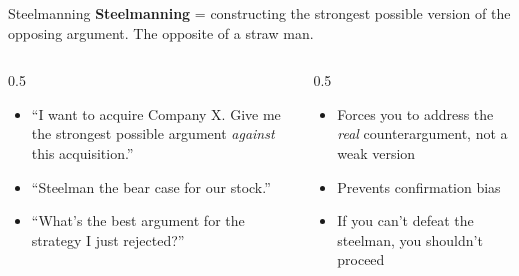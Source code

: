 \documentclass[aspectratio=169]{beamer}
\begin{document}
\begin{frame}{Steelmanning}
\textbf{Steelmanning} = constructing the \alert{strongest possible version} of the opposing argument.  The opposite of a straw man.
\vspace{0.3cm}
\begin{columns}[T]
\begin{column}{0.5\textwidth}
\begin{shadedbox}[title=\textbf{How to Use It}]
\begin{itemize}\small
  \item ``I want to acquire Company X.  Give me the strongest possible argument \textit{against} this acquisition.''
  \item ``Steelman the bear case for our stock.''
  \item ``What's the best argument for the strategy I just rejected?''
\end{itemize}
\end{shadedbox}
\end{column}
\begin{column}{0.5\textwidth}
\begin{shadedbox}[title=\textbf{Why It Works}]
\begin{itemize}\small
  \item Forces you to address the \textit{real} counterargument, not a weak version
  \item Prevents confirmation bias
  \item If you can't defeat the steelman, you shouldn't proceed
\end{itemize}
\end{shadedbox}
\end{column}
\end{columns}
\end{frame}
\end{document}
